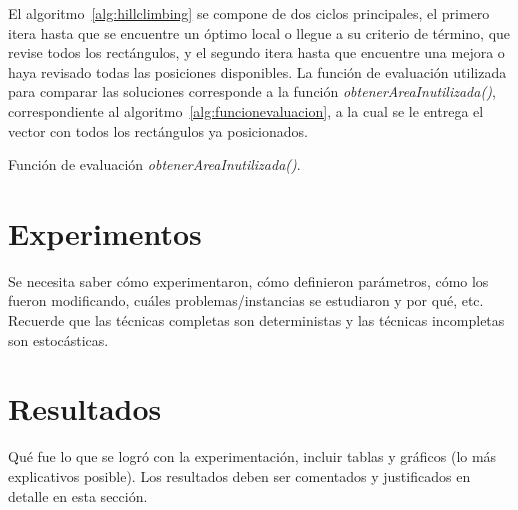 \documentclass[letter, 10pt]{article}
\begin{document}
El algoritmo~\ref{alg:hillclimbing} se compone de dos ciclos principales, el primero itera hasta que se encuentre un \'optimo local o llegue a su criterio de t\'ermino, que revise todos los rect\'angulos, y el segundo itera hasta que encuentre una mejora o haya revisado todas las posiciones disponibles. La funci\'on de evaluaci\'on utilizada para comparar las soluciones corresponde a la funci\'on \emph{obtenerAreaInutilizada()}, correspondiente al algoritmo~\ref{alg:funcionevaluacion}, a la cual se le entrega el vector con todos los rect\'angulos ya posicionados.
\vspace{0.2cm}

\begin{algorithm}[H]
    \caption{Funci\'on de evaluaci\'on \emph{obtenerAreaInutilizada()}.}
    \label{alg:funcionevaluacion}

    \SetNoFillComment 



\end{algorithm}

\section{Experimentos}

Se necesita saber c\'omo experimentaron, c\'omo definieron par\'ametros, 
c\'omo los fueron modificando, cu\'ales problemas/instancias se estudiaron y por qu\'e, etc. Recuerde que las t\'ecnicas completas son deterministas y las t\'ecnicas incompletas son estoc\'asticas.

\section{Resultados}

Qu\'e fue lo que se logr\'o con la experimentaci\'on, incluir tablas y gr\'aficos (lo m\'as explicativos posible). Los resultados deben ser comentados y justificados en detalle en esta secci\'on.
\end{document}
